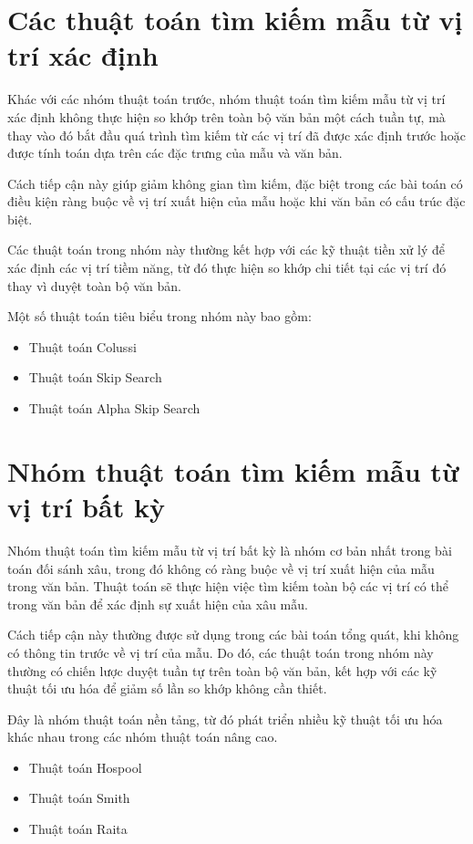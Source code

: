 \section{Các thuật toán tìm kiếm mẫu từ vị trí xác định}

Khác với các nhóm thuật toán trước, nhóm thuật toán tìm kiếm mẫu từ vị trí xác định không thực hiện so khớp trên toàn bộ văn bản một cách tuần tự, mà thay vào đó bắt đầu quá trình tìm kiếm từ các vị trí đã được xác định trước hoặc được tính toán dựa trên các đặc trưng của mẫu và văn bản.

Cách tiếp cận này giúp giảm không gian tìm kiếm, đặc biệt trong các bài toán có điều kiện ràng buộc về vị trí xuất hiện của mẫu hoặc khi văn bản có cấu trúc đặc biệt.

Các thuật toán trong nhóm này thường kết hợp với các kỹ thuật tiền xử lý để xác định các vị trí tiềm năng, từ đó thực hiện so khớp chi tiết tại các vị trí đó thay vì duyệt toàn bộ văn bản.

Một số thuật toán tiêu biểu trong nhóm này bao gồm:
\begin{itemize}
    \item Thuật toán Colussi
    \item Thuật toán Skip Search
    \item Thuật toán Alpha Skip Search
\end{itemize}

\section{Nhóm thuật toán tìm kiếm mẫu từ vị trí bất kỳ}

Nhóm thuật toán tìm kiếm mẫu từ vị trí bất kỳ là nhóm cơ bản nhất trong bài toán đối sánh xâu, trong đó không có ràng buộc về vị trí xuất hiện của mẫu trong văn bản. Thuật toán sẽ thực hiện việc tìm kiếm toàn bộ các vị trí có thể trong văn bản để xác định sự xuất hiện của xâu mẫu.

Cách tiếp cận này thường được sử dụng trong các bài toán tổng quát, khi không có thông tin trước về vị trí của mẫu. Do đó, các thuật toán trong nhóm này thường có chiến lược duyệt tuần tự trên toàn bộ văn bản, kết hợp với các kỹ thuật tối ưu hóa để giảm số lần so khớp không cần thiết.

Đây là nhóm thuật toán nền tảng, từ đó phát triển nhiều kỹ thuật tối ưu hóa khác nhau trong các nhóm thuật toán nâng cao.

\begin{itemize}
    \item Thuật toán Hospool
    \item Thuật toán Smith
    \item Thuật toán Raita
\end{itemize}